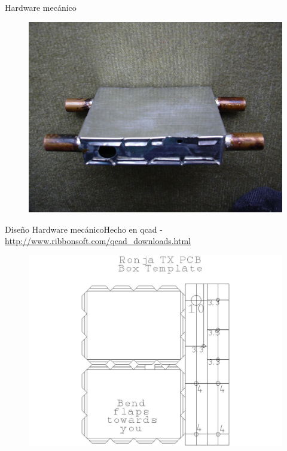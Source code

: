 \documentclass{beamer}
\begin{document}
\begin{frame}{Hardware mecánico}
  \begin{figure}
    \includegraphics[scale=0.9]{transmisor/1b50}
  \end{figure}
\end{frame}

\begin{frame}{Diseño Hardware mecánico}{Hecho en \alert{qcad} - \url{http://www.ribbonsoft.com/qcad_downloads.html}}
  \begin{figure}
    \includegraphics[scale=0.225]{transmisor/tx_pcb2}
  \end{figure}
\end{frame}
\end{document}
